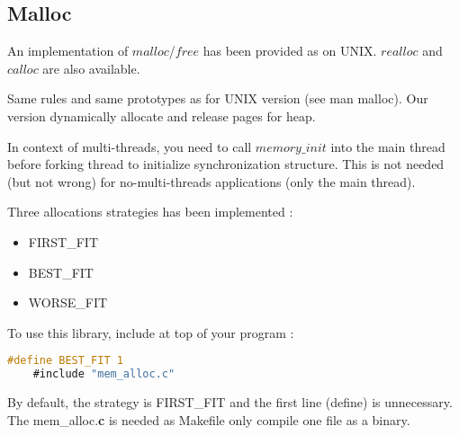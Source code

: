 \subsection{Malloc}
  An implementation of $malloc$/$free$ has been provided as on UNIX. $realloc$ and $calloc$
  are also available.

  Same rules and same prototypes as for UNIX version (see man malloc). Our
  version dynamically allocate and release pages for heap.

  In context of multi-threads, you need to call $memory\_init$ into the main thread
  before forking thread to initialize synchronization structure. This is not
  needed (but not wrong) for no-multi-threads applications (only the main thread).

  Three allocations strategies has been implemented :
  \begin{itemize}
  \item FIRST\_FIT
  \item BEST\_FIT
  \item WORSE\_FIT
  \end{itemize}
  To use this library, include at top of your program :

  \begin{lstlisting}[language=C]
    #define BEST_FIT 1 
    #include "mem_alloc.c"
  \end{lstlisting}
  By default, the strategy is FIRST\_FIT and the first line (define) is
  unnecessary. The mem\_alloc.\textbf{c} is needed as Makefile only compile one file as
  a binary.
